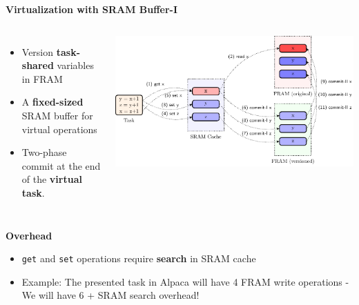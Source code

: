 

\begin{frame}{\textbf{Virtualization with SRAM Buffer-I}}
	\begin{columns}		
		
	\begin{itemize}
		\item Version \textbf{task-shared} variables in FRAM
		\item A \textbf{fixed-sized} SRAM buffer for virtual operations
		\item Two-phase commit at the end of the \textbf{virtual task}.
	\end{itemize}
	
	
\includegraphics[scale=0.5]{images/sram-buffer.pdf}	
\end{columns}
	
	\begin{block}{\textbf{Overhead}}
		\begin{itemize}
			\item \texttt{get} and \texttt{set} operations require \textbf{search} in SRAM cache
			\item Example: The presented task in Alpaca will have 4 FRAM write operations - We will have 6 + SRAM search overhead!
		\end{itemize}	
	\end{block}
	
\end{frame}




